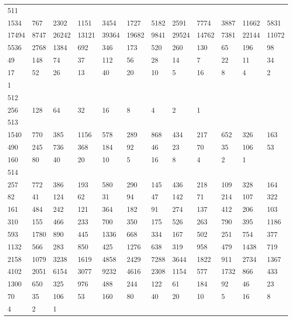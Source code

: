 \begin{longtable}{llllllllllll}
511&&&&&&&&&&&\\
1534& 767& 2302& 1151& 3454& 1727& 5182& 2591& 7774& 3887& 11662& 5831\\
17494& 8747& 26242& 13121& 39364& 19682& 9841& 29524& 14762& 7381& 22144& 11072\\
5536& 2768& 1384& 692& 346& 173& 520& 260& 130& 65& 196& 98\\
49& 148& 74& 37& 112& 56& 28& 14& 7& 22& 11& 34\\
17& 52& 26& 13& 40& 20& 10& 5& 16& 8& 4& 2\\
1& \\

512&&&&&&&&&&&\\
256& 128& 64& 32& 16& 8& 4& 2& 1& \\

513&&&&&&&&&&&\\
1540& 770& 385& 1156& 578& 289& 868& 434& 217& 652& 326& 163\\
490& 245& 736& 368& 184& 92& 46& 23& 70& 35& 106& 53\\
160& 80& 40& 20& 10& 5& 16& 8& 4& 2& 1& \\

514&&&&&&&&&&&\\
257& 772& 386& 193& 580& 290& 145& 436& 218& 109& 328& 164\\
82& 41& 124& 62& 31& 94& 47& 142& 71& 214& 107& 322\\
161& 484& 242& 121& 364& 182& 91& 274& 137& 412& 206& 103\\
310& 155& 466& 233& 700& 350& 175& 526& 263& 790& 395& 1186\\
593& 1780& 890& 445& 1336& 668& 334& 167& 502& 251& 754& 377\\
1132& 566& 283& 850& 425& 1276& 638& 319& 958& 479& 1438& 719\\
2158& 1079& 3238& 1619& 4858& 2429& 7288& 3644& 1822& 911& 2734& 1367\\
4102& 2051& 6154& 3077& 9232& 4616& 2308& 1154& 577& 1732& 866& 433\\
1300& 650& 325& 976& 488& 244& 122& 61& 184& 92& 46& 23\\
70& 35& 106& 53& 160& 80& 40& 20& 10& 5& 16& 8\\
4& 2& 1& \\


\end{longtable}
